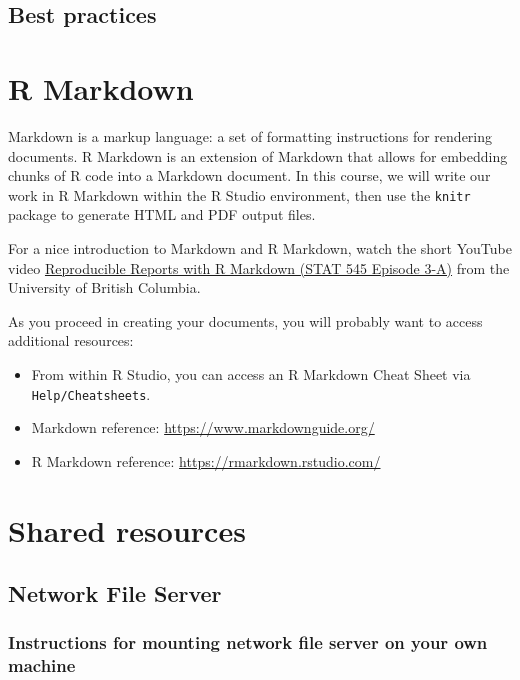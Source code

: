 \documentclass[
]{book}
\begin{document}
\hypertarget{best-practices}{%
\section{Best practices}\label{best-practices}}

\hypertarget{r-markdown}{%
\chapter{R Markdown}\label{r-markdown}}

Markdown is a markup language: a set of formatting instructions for rendering documents. R Markdown is an extension of Markdown that allows for embedding chunks of R code into a Markdown document. In this course, we will write our work in R Markdown within the R Studio environment, then use the \texttt{knitr} package to generate HTML and PDF output files.

For a nice introduction to Markdown and R Markdown, watch the short YouTube video \href{https://www.youtube.com/watch?v=ZzDSkBgt9xQ}{Reproducible Reports with R Markdown (STAT 545 Episode 3-A)} from the University of British Columbia.

As you proceed in creating your documents, you will probably want to access additional resources:

\begin{itemize}
\item
  From within R Studio, you can access an R Markdown Cheat Sheet via \texttt{Help/Cheatsheets}.
\item
  Markdown reference: \url{https://www.markdownguide.org/}
\item
  R Markdown reference: \url{https://rmarkdown.rstudio.com/}
\end{itemize}

\hypertarget{shared-resources-1}{%
\chapter{Shared resources}\label{shared-resources-1}}

\hypertarget{network-file-server}{%
\section{Network File Server}\label{network-file-server}}

\hypertarget{instructions-for-mounting-network-file-server-on-your-own-machine}{%
\subsection{Instructions for mounting network file server on your own machine}\label{instructions-for-mounting-network-file-server-on-your-own-machine}}
\end{document}
